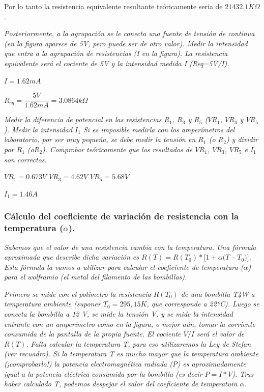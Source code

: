 \documentclass[paper=a4, fontsize=11pt]{scrartcl} %
\numberwithin{equation}{section} %
\numberwithin{figure}{section} %
\numberwithin{table}{section} %
\begin{document}
Por lo tanto la resistencia equivalente resultante teóricamente seria de $21432.1K \Omega$. \newline

\textit{Posteriormente, a la agrupación se le conecta una fuente de tensión de continua (en la figura aparece de 5V, pero puede ser de otro valor). Medir la intensidad que entra a la agrupación de resistencias (I en la figura). La resistencia equivalente será el cociente de 5V y la intensidad medida I (Req=5V/I).} \newline

$I=1.62mA$ \newline

$R_{eq} = \dfrac{5V}{1.62mA} = 3.0864 k \Omega$ \newline

\textit{Medir la diferencia de potencial en las resistencias $ R_{1} $, $ R_{3} $ y $ R_{5} $  ($VR_{1}$, $VR_{3}$ y $VR_{5}$). Medir la intensidad $ I_{1} $ Si es imposible medirla con los amperímetros del laboratorio, por ser muy pequeña, se debe medir la tensión en $ R_{1} $ (o $ R_{2} $) y dividir por $ R_{1} $ (o$  R_{2} $). Comprobar teóricamente que los resultados de $ VR_{1} $, $ VR_{3} $, $VR_{5} $ e $ I_{1} $ son correctos.} \newline

$VR_{1} = 0.673V$ \newline
$VR_{3} = 4.62V$ \newline
$VR_{5} = 5.68V$ \newline

$I_{1} = 1.46A$ \newpage

\subsubsection{Cálculo del coeficiente de variación de resistencia con la temperatura ($ \alpha $).} 

\textit{Sabemos que el valor de una resistencia cambia con la temperatura. Una fórmula aproximada que describe dicha variación es $ R(T)=R(T_{0})*[1 + \alpha (T $ - $ T_{0})] $. Esta fórmula la vamos a utilizar para calcular el coeficiente de temperatura ($ \alpha $) para el wolframio (el metal del filamento de las bombillas).} \newline

\textit{Primero se mide con el polímetro la resistencia $ R(T_{0}) $ de una bombilla T4W a temperatura ambiente (suponer $ T_{0}=295,15 K $, que corresponde a 22ºC). Luego se conecta la bombilla a 12 V, se mide la tensión V, y se mide la intensidad entrante con un amperímetro como en la figura, o mejor aún, tomar la corriente consumida de la pantalla de la propia fuente. El cociente $ V/I $ será el valor de $ R(T) $. Falta calcular la temperatura T, para eso utilizaremos la Ley de Stefan (ver recuadro). Si la temperatura T es mucho mayor que la temperatura ambiente (¡comprobarlo!) la potencia electromagnética radiada (P) es aproximadamente igual a la potencia eléctrica consumida por la bombilla (es decir $ P=I*V $). Tras haber calculado T, podemos despejar el valor del coeficiente de temperatura $ \alpha $.} \newline
\end{document}
